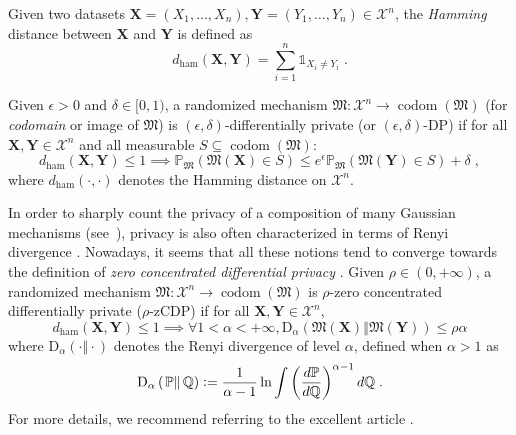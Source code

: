 \documentclass[10pt]{article} %
\def\Ind{\mathds{1}}
\newcommand{\Prob}[0]{\mathbb{P}}
\newcommand{\eqdef}{\vcentcolon=}
\newcommand\mech[1]{\mathfrak{#1}}
\newcommand\set[1]{\mathcal{#1}}
\newcommand\vect[1]{\mathbf{#1}}
\newcommand\codom[1]{\operatorname{codom}\left({#1}\right)}
\newcommand\renyi[3]{\text{D}_{#1}\left( \left. {#2}\right\Vert {#3} \right)}
\newcommand\ham[2]{d_\mathrm{ham}\left( {#1}, {#2} \right)}
\newcommand\p[1]{\left( {#1}\right)}
\newcommand\B[1]{{#1}}
\begin{document}
\B{Given two datasets $\vect{X} = (X_1, \dots, X_n), \vect{Y}= (Y_1, \dots, Y_n) \in \set{X}^n$, the \emph{Hamming} distance between $\vect{X}$ and $\vect{Y}$ is defined as}
\begin{equation*}
    \B{\ham{\vect{X}}{\vect{Y}} = \sum_{i=1}^n \Ind_{X_i \neq Y_i}} \;.
\end{equation*}

Given $\epsilon > 0$ and $\delta \in [0, 1)$, a randomized mechanism $\mech{M} : \set{X}^n \rightarrow \codom{\mech{M}}$ (for \emph{codomain} or image of $\mech{M}$) is $(\epsilon, \delta)$-differentially private (or $(\epsilon, \delta)$-DP) \citep{dwork2006calibrating,dwork2006our} if for all $\vect{X}, \vect{Y} \in \set{X}^n$ and all measurable $S \subseteq \codom{\mech{M}}$:
\begin{equation}
\label{eq:defdp}
    \ham{\vect{X}}{\vect{Y}} \leq 1 \implies \Prob_{\mech{M}}\p{\mech{M}(\vect{X}) \in S} \leq e^\epsilon \Prob_{\mech{M}}\p{\mech{M}(\vect{Y}) \in S} + \delta \;,
\end{equation}
where $\ham{\cdot}{\cdot}$ denotes the Hamming distance on $\set{X}^n$. 

In order to sharply count the privacy of a composition of many Gaussian mechanisms (see~\citet{abadi2016deep}), privacy is also often characterized in terms of Renyi divergence \citep{mironov2017renyi}. Nowadays, it seems that all these notions tend to converge towards the definition of \emph{zero concentrated differential privacy} \citep{dwork2016concentrated,bun2016concentrated}. Given $\rho \in (0, +\infty)$, a randomized mechanism $\mech{M} : \set{X}^n \rightarrow \codom{\mech{M}}$ is $\rho$-zero concentrated differentially private ($\rho$-zCDP) if for all $\vect{X}, \vect{Y} \in \set{X}^n$, %
\begin{equation}
\label{eq:defcdp}
    \ham{\vect{X}}{\vect{Y}} \leq 1 \implies   \forall 1 < \alpha < +\infty, \renyi{\alpha}{\mech{M}(\vect{X})}{\mech{M}(\vect{Y})} \leq \rho \alpha 
\end{equation}
where $\renyi{\alpha}{\cdot}{\cdot}$ denotes the Renyi divergence of level $\alpha$, defined when $\alpha>1$ as 
\begin{equation*}
    \renyi{\alpha}{\mathbb{P}}{\mathbb{Q}} \eqdef \frac{1}{\alpha - 1} \ln \int  \p{\frac{d \mathbb{P}}{ d \mathbb{Q}}}^{\alpha - 1} d \mathbb{Q} \;.
\end{equation*}
For more details, we recommend referring to the excellent article \citet{van2014renyi}.
\end{document}
